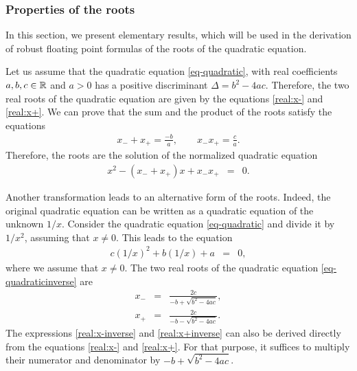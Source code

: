 \subsubsection{Properties of the roots}

In this section, we present elementary results, which will be 
used in the derivation of robust floating point formulas of the roots 
of the quadratic equation. 

Let us assume that the quadratic equation \ref{eq-quadratic}, with 
real coefficients $a,b,c\in\mathbb{R}$ and $a>0$ has a positive 
discriminant $\Delta=b^2-4ac$. Therefore, the two real roots of 
the quadratic equation are given by the equations \ref{real:x-} and \ref{real:x+}.
We can prove that the sum and the product of the roots satisfy the equations 
\begin{eqnarray}
\label{eq-rootsprops}
x_- + x_+ =\frac{-b}{a},\qquad
x_- x_+ =\frac{c}{a}.
\end{eqnarray}
Therefore, the roots are the solution of the normalized 
quadratic equation 
\begin{eqnarray}
\label{eq-rootsprops2}
x^2 - (x_- + x_+) x  + x_- x_+ &=&0.
\end{eqnarray}

Another transformation leads to an alternative form of the roots. 
Indeed, the original quadratic equation can be written as a quadratic 
equation of the unknown $1/x$. Consider the quadratic equation \ref{eq-quadratic}
and divide it by $1/x^2$, assuming that $x\neq 0$. This leads to the equation 
\begin{eqnarray}
\label{eq-quadraticinverse}
c(1/x)^2 + b (1/x)  + a &=&0,
\end{eqnarray}
where we assume that $x\neq 0$.
The two real roots of the quadratic equation \ref{eq-quadraticinverse} are 
\begin{eqnarray}
x_- &=& \frac{2c}{-b+ \sqrt{b^2-4ac}}, \label{real:x-inverse}\\
x_+ &=& \frac{2c}{-b- \sqrt{b^2-4ac}} \label{real:x+inverse}.
\end{eqnarray}
The expressions \ref{real:x-inverse} and \ref{real:x+inverse} can 
also be derived directly from the equations \ref{real:x-} and \ref{real:x+}.
For that purpose, it suffices to multiply their numerator and denominator 
by $-b+ \sqrt{b^2-4ac}$.

